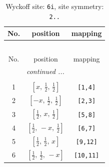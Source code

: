 \documentclass[fleqn,8pt]{jsarticle}
\begin{document}
\renewcommand{\arraystretch}{1.2}
\begin{longtable}{ccc}
\caption{Wyckoff site: {\tt 6i}, site symmetry: {\tt 2..}}
 \\
 \hline \hline
No. & position & mapping \\ \hline \endfirsthead

\multicolumn{2}{l}{\tablename\ \thetable{}} \\
 \hline \hline
No. & position & mapping \\ \hline \endhead

 \hline \hline
\multicolumn{2}{r}{\footnotesize\it continued ...} \\ \endfoot

 \hline \hline
\multicolumn{2}{r}{} \\ \endlastfoot

1 & $\left[ x,\, \frac{1}{2},\, \frac{1}{2} \right]$ & {\tt [1,4]} \\ \hline
2 & $\left[ - x,\, \frac{1}{2},\, \frac{1}{2} \right]$ & {\tt [2,3]} \\ \hline
3 & $\left[ \frac{1}{2},\, x,\, \frac{1}{2} \right]$ & {\tt [5,8]} \\ \hline
4 & $\left[ \frac{1}{2},\, - x,\, \frac{1}{2} \right]$ & {\tt [6,7]} \\ \hline
5 & $\left[ \frac{1}{2},\, \frac{1}{2},\, x \right]$ & {\tt [9,12]} \\ \hline
6 & $\left[ \frac{1}{2},\, \frac{1}{2},\, - x \right]$ & {\tt [10,11]} \\
\end{longtable}
\renewcommand{\arraystretch}{1.2}
\end{document}
